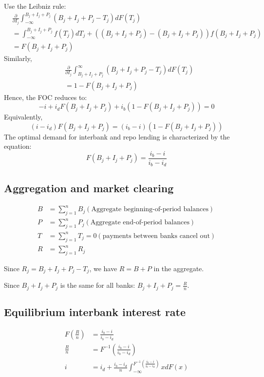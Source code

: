 Use the Leibniz rule:
\begin{align*}
    & \frac{\partial}{\partial I_j} \int_{-\infty}^{B_j + I_j + P_j} (B_j + I_j + P_j - T_j) dF(T_j) \\
    &= \int_{-\infty}^{B_j + I_j + P_j} f(T_j)d T_j + \left((B_j + I_j + P_j) - (B_j + I_j + P_j)\right)f(B_j + I_j + P_j) \\
    &= F(B_j + I_j + P_j) 
\end{align*}
Similarly,
\begin{align*}
    & \frac{\partial}{\partial I_j} \int_{B_j + I_j + P_j}^{\infty} (B_j + I_j + P_j - T_j) dF(T_j) \\
    &= 1 - F(B_j + I_j + P_j)
\end{align*}
Hence, the FOC reduces to:
\[
-i + i_d F(B_j + I_j + P_j) + i_b (1 - F(B_j + I_j + P_j)) = 0
\]
Equivalently,
\[
(i - i_d)F(B_j + I_j + P_j) = (i_b - i)(1 - F(B_j + I_j + P_j))
\]
The optimal demand for interbank and repo lending is characterized by the equation: 
\[
F(B_j + I_j + P_j) = \frac{i_b - i}{i_b - i_d}
\]

\subsection{Aggregation and market clearing}
\begin{align*}
    B &= \sum_{j=1}^{n}B_j (\text{Aggregate beginning-of-period balances})\\
    P &= \sum_{j=1}^{n}P_j (\text{Aggregate end-of-period balances})\\
    T &= \sum_{j=1}^{n}T_j = 0 (\text{payments between banks cancel out})  \\
    R &= \sum_{j=1}^{n}R_j
\end{align*}

Since $R_j = B_j + I_j + P_j - T_j$, we have $R = B+P$ in the aggregate.

Since $B_j + I_j + P_j$ is the same for all banks: $B_j + I_j + P_j = \frac{R}{n}$.

\subsection{Equilibrium interbank interest rate}
\begin{align*}
    F\left(\frac{R}{n}\right) &= \frac{i_b - i}{i_b - i_d} \\
    \frac{R}{n} &= F^{-1}\left(\frac{i_b - i}{i_b - i_d}\right) \\
    i &= i_d + \frac{i_b - i_d}{n} \int_{-\infty}^{F^{-1}\left(\frac{i_b - i}{i_b - i_d}\right)} x dF(x)
\end{align*}

